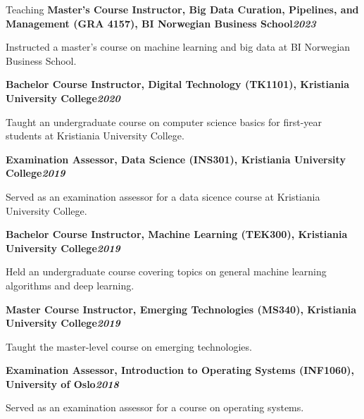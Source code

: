 \begin{rubric}{Teaching}
\entry*[]%
\textbf{Master's Course Instructor, Big Data Curation, Pipelines, and Management (GRA 4157), BI Norwegian Business School\hfill\textit{2023}} \par
\begin{compactitem}
    \item Instructed a master's course on machine learning and big data at BI Norwegian Business School.
    \vspace{-12pt}
\end{compactitem}
%
\entry*[]%
\textbf{Bachelor Course Instructor, Digital Technology (TK1101), Kristiania University College\hfill\textit{2020}} \par
\begin{compactitem}
    \item Taught an undergraduate course on computer science basics for first-year students at Kristiania University College.
    \vspace{-12pt}
\end{compactitem}
%
\entry*[]%
\textbf{Examination Assessor, Data Science (INS301), Kristiania University College\hfill\textit{2019}} \par
\begin{compactitem}
    \item Served as an examination assessor for a data sicence course at Kristiania University College.
    \vspace{-12pt}
\end{compactitem}
%
\entry*[]%
\textbf{Bachelor Course Instructor, Machine Learning (TEK300), Kristiania University College\hfill\textit{2019}} \par
\begin{compactitem}
    \item Held an undergraduate course covering topics on general machine learning algorithms and deep learning.
    \vspace{-12pt}
\end{compactitem}
%
\entry*[]%
\textbf{Master Course Instructor, Emerging Technologies (MS340), Kristiania University College\hfill\textit{2019}} \par
\begin{compactitem}
    \item Taught the master-level course on emerging technologies.
    \vspace{-12pt}
\end{compactitem}
%
\entry*[]%
\textbf{Examination Assessor, Introduction to Operating Systems (INF1060), University of Oslo\hfill\textit{2018}} \par
\begin{compactitem}
    \item Served as an examination assessor for a course on operating systems.
    \vspace{-12pt}
\end{compactitem}
\end{rubric}
